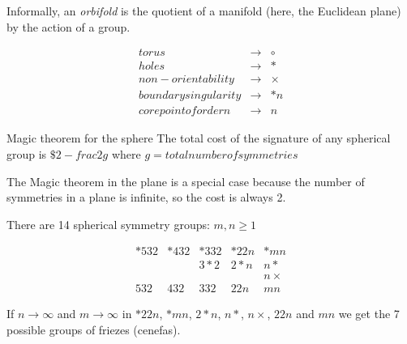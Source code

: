 


\begin{definition}
Informally, an \emph{orbifold} is the quotient of a manifold (here, the Euclidean plane) by the action of a group.
\end{definition}

\begin{displaymath}
	\begin{array}{lcc}
		torus & \longrightarrow & \circ \\
		holes & \longrightarrow & * \\
		non-orientability & \longrightarrow & \times \\
		boundary singularity & \longrightarrow & *n \\
		core point of order n & \longrightarrow & n \
	\end{array}
\end{displaymath}

\begin{theorem}{Magic theorem for the sphere}
The total cost of the signature of any spherical group is $ \$ 2-frac{2}{g} $ where $g=total number of symmetries$
\end{theorem}

The Magic theorem in the plane is a special case because the number of symmetries in a plane is infinite, so the cost is always 2.

There are 14 spherical symmetry groups: $m,n\geq1$

\begin{displaymath}
	\begin{array}{lcccc}
		*532 & *432 & *332 & *22n & *mn \\
		 & & 3*2 & 2*n & n* \\
		 & & & & n\times \\
		 532 & 432 & 332 & 22n & mn 
	\end{array}
\end{displaymath}

If $n\rightarrow\infty$ and $m\rightarrow\infty$ in $*22n$, $*mn$, $2*n$, $n*$, $n\times$, $22n$ and $mn$ we get the 7 possible groups of friezes (cenefas).
